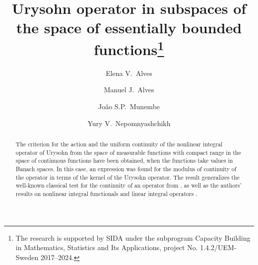 \documentclass[12pt]{llncs}
\begin{document}
\fi

\title{Urysohn operator in subspaces of the space of essentially bounded functions\thanks{The research is supported by SIDA under the subprogram Capacity Building in Mathematics, Statistics and Its Applications, project No. 1.4.2/UEM-Sweden 2017--2024.}}

\author{Elena V.~Alves
  \and
  Manuel J.~Alves
  \and
  Jo\~ao S.P.~Munembe
  \and
  Yury V.~Nepomnyashchikh
}

\maketitle

\begin{abstract}
The criterion for the action and the uniform continuity of the nonlinear integral operator of Urysohn from the space of measurable functions with compact range in the space of continuous functions have been obtained, when the functions take values in Banach spaces. In this case, an expression was found for the modulus of continuity of the operator in terms of the kernel of the Urysohn operator. The result generalizes the well-known classical test for the continuity of an operator from \cite[p.~372]{Z}, as well as the authors' results on nonlinear integral functionals \cite{AAMN1} and linear integral operators \cite{AAMN2}.

\end{abstract}
\end{document}
